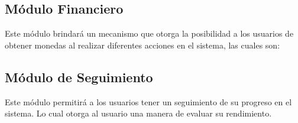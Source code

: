 \subsection*{Módulo Financiero}

 \noindent 
 Este módulo brindará un mecanismo que otorga la posibilidad a los usuarios de 
 obtener monedas al realizar diferentes acciones en el sistema, las cuales son:





\subsection*{Módulo de Seguimiento}

 \noindent
 Este módulo permitirá a los usuarios tener un seguimiento de su progreso en el sistema. 
 Lo cual otorga al usuario una manera de evaluar su rendimiento.


% 

